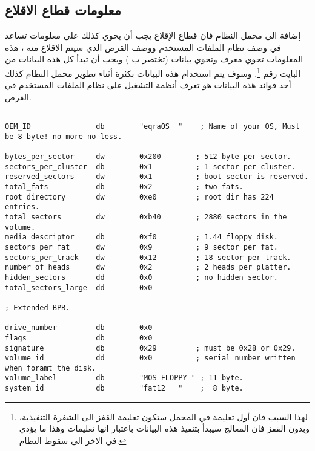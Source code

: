 \documentclass[document.tex]{subfiles}
\begin{document}
\subsection{معلومات قطاع الاقلاع}
إضافة الى محمل النظام فان قطاع الإقلاع  يجب أن يحوي كذلك على معلومات تساعد في وصف نظام الملفات المستخدم ووصف القرص الذي سيتم الاقلاع منه ، هذه المعلومات تحوي معرف  وتحوي بيانات  (تختصر ب ) ويجب أن تبدأ كل هذه البيانات من البايت رقم \footnote{لهذا السبب فان أول تعليمة في المحمل ستكون تعليمة القفز الى الشفرة التنفيذية، وبدون القفز فان المعالج سيبدأ بتنفيذ هذه البيانات باعتبار انها تعليمات وهذا ما يؤدي في الاخر الى سقوط النظام.}. وسوف يتم استخدام هذه البيانات بكثرة أثناء تطوير محمل النظام كذلك أحد فوائد هذه البيانات هو  تعرف أنظمة التشغيل على نظام الملفات المستخدم في القرص.


\begin{english}

\lstset{numberstyle=\tiny,numbersep=5pt,tabsize=2,extendedchars=true,breaklines=true,frame=b,showspaces=false, showtabs=false,xleftmargin=10pt,framexleftmargin=10pt,framexrightmargin=5pt,framexbottommargin=4pt,showstringspaces=false,language=[x86masm]Assembler}

\begin{lstlisting}[label=lst:bpb,caption=Bios Parameter Block]

OEM_ID               db        "eqraOS  "    ; Name of your OS, Must be 8 byte! no more no less.

bytes_per_sector     dw        0x200		; 512 byte per sector.
sectors_per_cluster  db        0x1          ; 1 sector per cluster.
reserved_sectors     dw        0x1          ; boot sector is reserved.
total_fats           db        0x2          ; two fats.
root_directory       dw        0xe0         ; root dir has 224 entries.
total_sectors        dw        0xb40        ; 2880 sectors in the volume.
media_descriptor     db        0xf0         ; 1.44 floppy disk.
sectors_per_fat      dw        0x9          ; 9 sector per fat.
sectors_per_track    dw        0x12         ; 18 sector per track.
number_of_heads      dw        0x2          ; 2 heads per platter.
hidden_sectors       dd        0x0          ; no hidden sector.
total_sectors_large  dd        0x0

; Extended BPB.

drive_number         db        0x0
flags                db        0x0
signature            db        0x29         ; must be 0x28 or 0x29.
volume_id            dd        0x0          ; serial number written when foramt the disk.
volume_label         db        "MOS FLOPPY " ; 11 byte.
system_id            db        "fat12   "    ;  8 byte.

\end{lstlisting}
\end{english}
\end{document}
